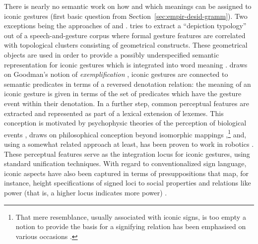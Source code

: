 \documentclass[output=paper]{langsci/langscibook}
\begin{document}
 
There is nearly no semantic work on how and which meanings can be assigned to iconic gestures (first basic question from Section~\ref{sec:empir-desid-gramm}).
%
Two exceptions being the approaches of \citet{Rieser:2010} and \citet{Luecking:2013:a,Luecking:2016}.
%
\citet{Rieser:2010} tries to extract a \enquote{depiction typology} out of a speech-and-gesture corpus where formal gesture features are correlated with topological clusters consisting of geometrical constructs. 
%
These geometrical objects are used in order to provide a possibly underspecified semantic representation for iconic gestures which is integrated into word meaning \citep{Hahn:Rieser:2010,Rieser:2011}.
%
\citet{Luecking:2013:a,Luecking:2016} draws on Goodman's notion of \emph{exemplification} \citep{Goodman:1976}, iconic gestures are connected to semantic predicates in terms of a reversed denotation relation: the meaning of an iconic gesture is given in terms of the set of predicates which have the gesture event within their denotation. 
%
In a further step, common perceptual features are extracted and represented as part of a lexical extension of lexemes. 
%
This conception is motivated by psychophysic theories of the perception of biological events \citep{Johansson:1973}, draws on philosophical  conception beyond isomorphic mappings \citep{Peacocke:1987},\footnote{That mere resemblance, usually associated with iconic signs, is too empty a notion to provide the basis for a signifying relation has been emphasised on various occasions \citep{Burks:1949,Bierman:1962,Eco:1976,Goodman:1976,Sonesson:1998}.} and, using a somewhat related approach at least, has been proven to work in robotics \citep{Sowa:2006:a}.
%
These perceptual features serve as the integration locus for iconic gestures, using standard unification techniques. 
%
With regard to conventionalized sign language, iconic aspects have also been captured in terms of presuppositions that map, for instance, height specifications of signed loci to social properties and relations like power (that is, a higher locus indicates more power) \citep{Schlenker:Lamberton:Santoro:2013}.
\end{document}
